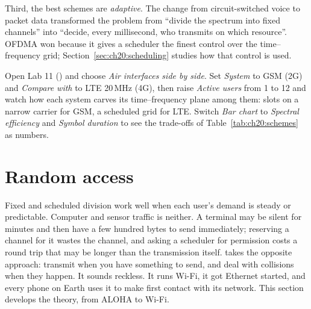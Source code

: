 Third, the best schemes are \emph{adaptive}. The change from circuit-switched voice to packet data
transformed the problem from ``divide the spectrum into fixed channels'' into ``decide, every
millisecond, who transmits on which resource''. OFDMA won because it gives a scheduler the finest
control over the time--frequency grid; Section~\ref{sec:ch20:scheduling} studies how that control is
used.

\begin{tryit}
Open Lab 11 () and choose \emph{Air interfaces side by side}. Set
\emph{System} to GSM (2G) and \emph{Compare with} to LTE 20\,MHz (4G), then raise \emph{Active users}
from 1 to 12 and watch how each system carves its time--frequency plane among them: slots on a narrow
carrier for GSM, a scheduled grid for LTE. Switch \emph{Bar chart} to \emph{Spectral efficiency} and
\emph{Symbol duration} to see the trade-offs of Table~\ref{tab:ch20:schemes} as numbers.
\end{tryit}

\section{Random access}
\label{sec:ch20:random}

Fixed and scheduled division work well when each user's demand is steady or predictable. Computer
and sensor traffic is neither. A terminal may be silent for minutes and then have a few hundred bytes
to send immediately; reserving a channel for it wastes the channel, and asking a scheduler for
permission costs a round trip that may be longer than the transmission itself. 
takes the opposite approach: transmit when you have something to send, and deal with collisions when
they happen. It sounds reckless. It runs Wi-Fi, it got Ethernet started, and every phone on Earth uses
it to make first contact with its network. This section develops the theory, from ALOHA to Wi-Fi.


